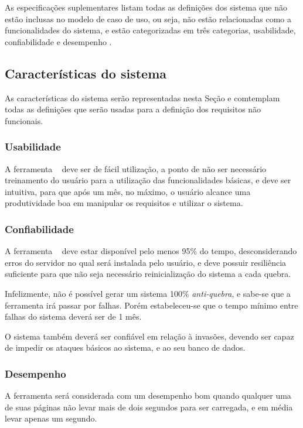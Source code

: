 As especificações suplementares listam todas as definições dos sistema que não estão inclusas no modelo de caso de uso, ou seja, não estão relacionadas como a funcionalidades do sistema, e estão categorizadas em três categorias, usabilidade, confiabilidade e desempenho \cite{rup}.

\subsection{Características do sistema}
\label{subSection:suplementares_Caract_sistema}
As características do sistema serão representadas nesta Seção e comtemplam todas as definições que serão usadas para a definição dos requisitos não funcionais.

\subsubsection{Usabilidade}
	
	A ferramenta \nomeferramenta~ deve ser de fácil utilização, a ponto de não ser necessário treinamento do usuário para a utilização das funcionalidades básicas, e deve ser intuitiva, para que após um mês, no máximo, o usuário alcance uma produtividade boa em manipular os requisitos e utilizar o sistema.

\subsubsection{Confiabilidade}

	A ferramenta \nomeferramenta~ deve estar disponível pelo menos 95\% do tempo, desconsiderando erros do servidor no qual será instalada pelo usuário, e deve possuir resiliência suficiente para que não seja necessário reinicialização do sistema a cada quebra.

	Infelizmente, não é possível gerar um sistema 100\% \textit{anti-quebra}, e sabe-se que a ferramenta irá passar por falhas. Porém estabeleceu-se que o tempo mínimo entre falhas do sistema deverá ser de 1 mês.

	O sistema também deverá ser confiável em relação à invasões, devendo ser capaz de impedir os ataques básicos ao sistema, e ao seu banco de dados.

\subsubsection{Desempenho}

	A ferramenta será considerada com um desempenho bom quando qualquer uma de suas páginas não levar mais de dois segundos para ser carregada, e em média levar apenas um segundo.

